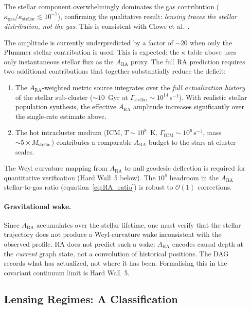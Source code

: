 \documentclass[11pt,a4paper]{article}
\theoremstyle{plain}
\theoremstyle{definition}
\theoremstyle{remark}
\begin{document}
\noindent
The stellar component overwhelmingly dominates the gas contribution
($\kappa_{\mathrm{gas}} / \kappa_{\mathrm{stellar}} \lesssim 10^{-7}$),
confirming the qualitative result: \emph{lensing traces the stellar
distribution, not the gas}. This is consistent with Clowe et al.~\citep{Clowe2006}.

The amplitude is currently underpredicted by a factor of $\sim 20$ when
only the Plummer stellar contribution is used. This is expected: the $\kappa$
table above uses only instantaneous stellar flux as the $A_{\mathrm{RA}}$ proxy.
The full RA prediction requires two additional contributions that together
substantially reduce the deficit:
\begin{enumerate}[noitemsep]
  \item The $A_{\mathrm{RA}}$-weighted metric source integrates over the
        \emph{full actualization history} of the stellar sub-cluster
        ($\sim 10$~Gyr at $\Gamma_{\mathrm{stellar}} \sim 10^{14}\,\mathrm{s}^{-1}$).
        With realistic stellar population synthesis, the effective $A_{\mathrm{RA}}$
        amplitude increases significantly over the single-rate estimate above.
  \item The hot intracluster medium (ICM, $T \sim 10^8$~K,
        $\Gamma_{\mathrm{ICM}} \sim 10^6\,\mathrm{s}^{-1}$,
        mass $\sim 5\times M_{\mathrm{stellar}}$) contributes a comparable
        $A_{\mathrm{RA}}$ budget to the stars at cluster scales.
\end{enumerate}
The Weyl curvature mapping from $A_{\mathrm{RA}}$ to null geodesic deflection
is required for quantitative verification (Hard Wall~5 below). The
$10^8$ headroom in the $A_{\mathrm{RA}}$ stellar-to-gas ratio
(equation~\eqref{eq:RA_ratio}) is robust to $\mathcal{O}(1)$ corrections.

\paragraph{Gravitational wake.}
Since $A_{\mathrm{RA}}$ accumulates over the stellar lifetime, one must verify
that the stellar trajectory does not produce a Weyl-curvature wake inconsistent
with the observed profile. RA does not predict such a wake: $A_{\mathrm{RA}}$
encodes causal depth at the \emph{current} graph state, not a convolution of
historical positions. The DAG records what has actualized, not where it has been.
Formalising this in the covariant continuum limit is Hard Wall~5.

\subsection{Lensing Regimes: A Classification}
\label{sec:lensing_regimes}
\end{document}
